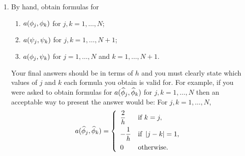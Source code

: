 \begin{enumerate}
\item By hand, obtain formulas for
\begin{enumerate}
\item $a(\phi_j,\phi_k)$ for $j,k=1,\ldots,N$;

\item $a(\psi_j,\psi_k)$ for $j,k=1,\ldots,N+1$;

\item $a(\phi_j,\psi_k)$ for $j=1,\ldots,N$ and $k=1,\ldots,N+1$.
\end{enumerate}
Your final answers should be in terms of $h$ and you must clearly state which values of $j$ and $k$ each formula you obtain is valid for. For example, if you were asked to obtain formulas for $a(\widehat{\phi}_j,\widehat{\phi}_k)$ for $j,k=1,\ldots,N$ then an acceptable way to present the answer would be:\newline
For $j,k=1,\ldots,N$,
\[
a(\widehat{\phi}_j,\widehat{\phi}_k)=\left\{\begin{array}{ll}\displaystyle{{2 \over h}} & \mbox{if }k=j, \\[.75em] \displaystyle{-{1 \over h}} & \mbox{if }\left|j-k\right|=1, \\[.75em] \displaystyle{0} & \mbox{otherwise}.\end{array}\right.
\]
\end{enumerate}



